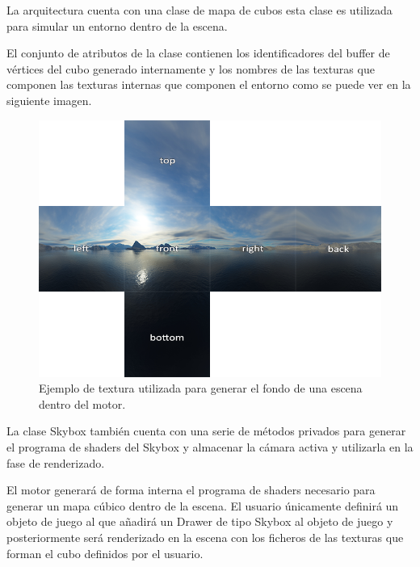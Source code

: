 \documentclass[a4paper, 17pt]{book}
\begin{document}
La arquitectura cuenta con una clase de mapa de cubos esta clase es utilizada para simular un entorno dentro de la escena. 

\vspace{1mm} %

El conjunto de atributos de la clase contienen los identificadores del buffer de vértices del cubo generado internamente y
los nombres de las texturas que componen las texturas internas que componen el entorno como se puede ver en la siguiente imagen.

\begin{figure}[H]
    \centering
    \includegraphics[scale=0.20, keepaspectratio]{img/cubemaps_skybox.png}
    \caption{Ejemplo de textura utilizada para generar el fondo de una escena dentro del motor.}
    \label{figura:cubemaps_skybox}
\end{figure}

La clase Skybox también cuenta con una serie de métodos privados para generar el programa de shaders del Skybox y almacenar la cámara
activa y utilizarla en la fase de renderizado.

\vspace{1mm} %

El motor generará de forma interna el programa de shaders necesario para generar un mapa cúbico dentro de la escena. El usuario únicamente
definirá un objeto de juego al que añadirá un Drawer de tipo Skybox al objeto de juego y posteriormente será renderizado en la escena con
los ficheros de las texturas que forman el cubo definidos por el usuario.
\end{document}
